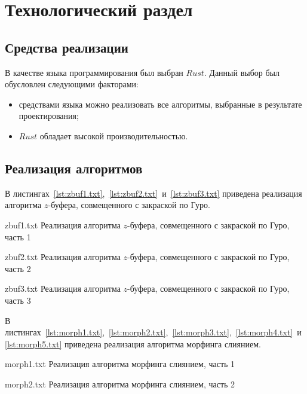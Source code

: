 \chapter{Технологический раздел}

\section{Средства реализации}

В качестве языка программирования был выбран $Rust$. Данный выбор был обусловлен следующими факторами:

\begin{itemize}[label*=---]
	\item средствами языка можно реализовать все алгоритмы, выбранные в результате проектирования;
	\item $Rust$ обладает высокой производительностью. \cite{RUST_IS_THE_BEST}
\end{itemize}


\section{Реализация алгоритмов}

В листингах~\ref{lst:zbuf1.txt},~\ref{lst:zbuf2.txt}~и~\ref{lst:zbuf3.txt} приведена реализация алгоритма $z$-буфера, совмещенного с закраской по Гуро. 

{zbuf1.txt}
{Реализация алгоритма $z$-буфера, совмещенного с закраской по Гуро, часть 1}

\clearpage

{zbuf2.txt}
{Реализация алгоритма $z$-буфера, совмещенного с закраской по Гуро, часть 2}

\clearpage

{zbuf3.txt}
{Реализация алгоритма $z$-буфера, совмещенного с закраской по Гуро, часть 3}

\clearpage

В листингах~\ref{lst:morph1.txt},~\ref{lst:morph2.txt},~\ref{lst:morph3.txt},~\ref{lst:morph4.txt}~и~\ref{lst:morph5.txt} приведена реализация алгоритма морфинга слиянием. 

{morph1.txt}
{Реализация алгоритма морфинга слиянием, часть 1}

\clearpage

{morph2.txt}
{Реализация алгоритма морфинга слиянием, часть 2}

